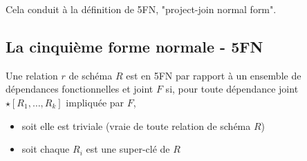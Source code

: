 		 Cela conduit à la définition de 5FN, "project-join normal form".
		 
		 \subsection{La cinquième forme normale - 5FN}
		 
		 Une relation $r$ de schéma $R$ est en 5FN par rapport à un ensemble de dépendances fonctionnelles et joint $F$ si, pour toute dépendance joint $\star[R_1, \dots , R_k]$ impliquée par $F$,
		 
		 \begin{itemize}
		 	\item soit elle est triviale (vraie de toute relation de schéma $R$)
		 	\item soit chaque $R_i$ est une super-clé de $R$
		 \end{itemize}